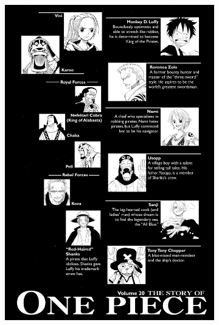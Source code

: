 \begin{figure}[htbp]
    \centering
    \begin{subfigure}[b]{0.25\textwidth}
        \includegraphics[width=\textwidth]{chapter/output/bad57.png}
      

\end{subfigure}
\end{figure}
